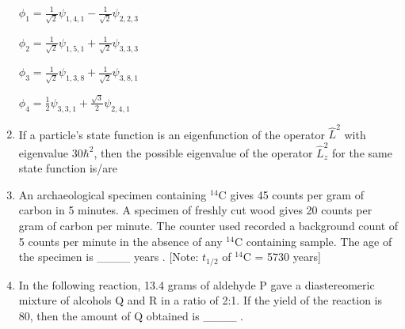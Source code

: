 \documentclass[journal,12pt,onecolumn]{IEEEtran}
\theoremstyle{remark}
\begin{document}
\begin{enumerate}
$\phi_1 = \frac{1}{\sqrt{2}}\psi_{1,4,1} - \frac{1}{\sqrt{2}}\psi_{2,2,3}$

$\phi_2 = \frac{1}{\sqrt{2}}\psi_{1,5,1} + \frac{1}{\sqrt{2}}\psi_{3,3,3}$

$\phi_3 = \frac{1}{\sqrt{2}}\psi_{1,3,8} + \frac{1}{\sqrt{2}}\psi_{3,8,1}$

$\phi_4 = \frac{1}{2}\psi_{3,3,1} + \frac{\sqrt{3}}{2}\psi_{2,4,1}$
    \begin{enumerate}
    \end{enumerate}      \hfill{}



\item If a particle's state function is an eigenfunction of the operator $\hat{L}^2$ with eigenvalue $30\hbar^2$, then the possible eigenvalue of the operator $\hat{L}_z^2$ for the same state function is/are
    \begin{enumerate}
    \end{enumerate}      \hfill{}



\item An archaeological specimen containing $^{14}$C gives 45 counts per gram of carbon in 5 minutes. A specimen of freshly cut wood gives 20 counts per gram of carbon per minute. The counter used recorded a background count of 5 counts per minute in the absence of any $^{14}$C containing sample. The age of the specimen is \_\_\_\_ years . [Note: $t_{1/2}$ of $^{14}$C = 5730 years]
 \hfill{}





\item In the following reaction, 13.4 grams of aldehyde P gave a diastereomeric mixture of alcohols Q and R in a ratio of 2:1. If the yield of the reaction is 80, then the amount of Q  obtained is \_\_\_\_ . \hfill{}






\end{enumerate}
\end{document}
